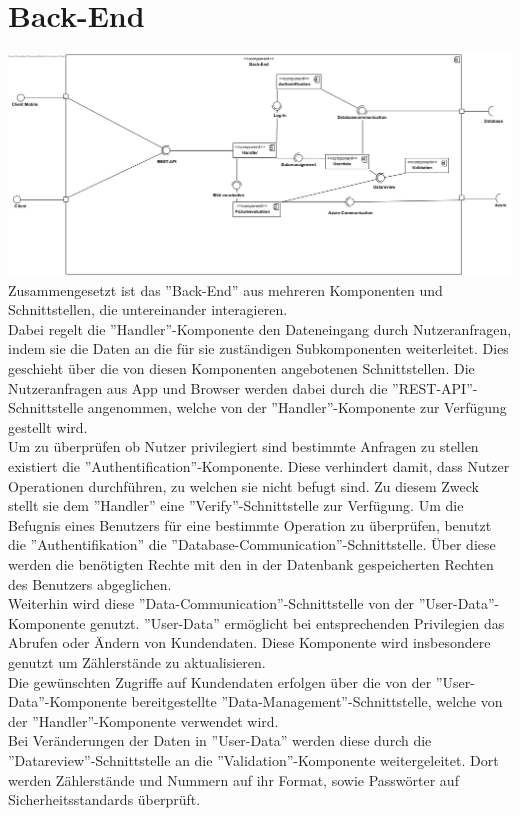 \section{Back-End}
\includegraphics[width=15cm]{img/diagrams/component-back-end}
Zusammengesetzt ist das ''Back-End'' aus mehreren Komponenten und Schnittstellen, die untereinander interagieren.\\
Dabei regelt die ''Handler''-Komponente den Dateneingang durch Nutzeranfragen, indem sie die Daten an die für sie zuständigen Subkomponenten weiterleitet. Dies geschieht über die von diesen Komponenten angebotenen Schnittstellen. Die Nutzeranfragen aus App und Browser werden dabei durch die ''REST-API''-Schnittstelle angenommen, welche von der ''Handler''-Komponente zur Verfügung gestellt wird.\\
Um zu überprüfen ob Nutzer privilegiert sind bestimmte Anfragen zu stellen existiert die ''Authentification''-Komponente. Diese verhindert damit, dass Nutzer Operationen durchführen, zu welchen sie nicht befugt sind. Zu diesem Zweck stellt sie dem ''Handler'' eine ''Verify''-Schnittstelle zur Verfügung. Um die Befugnis eines Benutzers für eine bestimmte Operation zu überprüfen, benutzt die ''Authentifikation'' die ''Database-Communication''-Schnittstelle. Über diese werden die benötigten Rechte mit den in der Datenbank gespeicherten Rechten des Benutzers abgeglichen.\\
Weiterhin wird diese ''Data-Communication''-Schnittstelle von der ''User-Data''-Komponente genutzt. ''User-Data'' ermöglicht bei entsprechenden Privilegien das Abrufen oder Ändern von Kundendaten. Diese Komponente wird insbesondere genutzt um Zählerstände zu aktualisieren.\\
Die gewünschten Zugriffe auf Kundendaten erfolgen über die von der ''User-Data''-Komponente bereitgestellte ''Data-Management''-Schnittstelle, welche von der ''Handler''-Komponente verwendet wird.\\
Bei Veränderungen der Daten in ''User-Data'' werden diese durch die ''Datareview''-Schnittstelle an die ''Validation''-Komponente weitergeleitet. Dort werden Zählerstände und Nummern auf ihr Format, sowie Passwörter auf Sicherheitsstandards überprüft.\\
